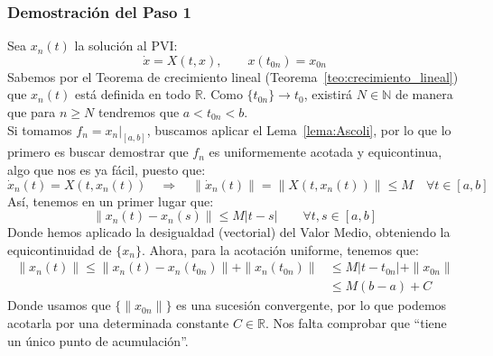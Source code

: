 \subsubsection{Demostración del Paso 1}
\noindent
Sea $x_n(t)$ la solución al PVI:
\begin{equation*}
    \dot{x} = X(t,x), \qquad x(t_{0n}) = x_{0n}
\end{equation*}
Sabemos por el Teorema de crecimiento lineal (Teorema~\ref{teo:crecimiento_lineal}) que $x_n(t)$ está definida en todo $\mathbb{R}$. Como $\{t_{0n}\}\to t_0$, existirá $N\in \mathbb{N}$ de manera que para $n\geq N$ tendremos que $a<t_{0n}<b$.\\

\noindent
Si tomamos $f_n = x_n\big|_{[a,b]}$, buscamos aplicar el Lema~\ref{lema:Ascoli}, por lo que lo primero es buscar demostrar que $f_n$ es uniformemente acotada y equicontinua, algo que nos es ya fácil, puesto que:
\begin{equation*}
    \dot{x}_n(t) = X(t,x_n(t)) \quad\Longrightarrow\quad \|\dot{x}_n(t)\| = \|X(t,x_n(t))\| \leq M \quad \forall t\in [a,b]
\end{equation*}
Así, tenemos en un primer lugar que:
\begin{equation*}
    \|x_n(t) - x_n(s)\| \leq M|t-s| \qquad \forall t,s\in [a,b]
\end{equation*}
Donde hemos aplicado la desigualdad (vectorial) del Valor Medio, obteniendo la equicontinuidad de $\{x_n\}$. Ahora, para la acotación uniforme, tenemos que:
\begin{align*}
    \|x_n(t)\| \leq \|x_n(t) - x_n(t_{0n})\| + \|x_n(t_{0n})\| &\leq M|t-t_{0n}| + \|x_{0n}\| \\
                                                               &\leq M(b-a) + C
\end{align*}
Donde usamos que $\{\|x_{0n}\|\}$ es una sucesión convergente, por lo que podemos acotarla por una determinada constante $C\in \mathbb{R}$. Nos falta comprobar que ``tiene un único punto de acumulación''.\\


